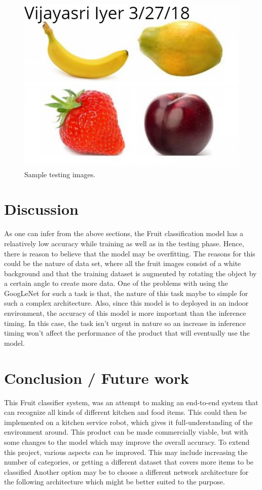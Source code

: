 \documentclass[10pt,journal,compsoc]{IEEEtran}
\begin{document}
\begin{figure}[tbhp]
      \centering
      \includegraphics[width=\linewidth]{own_img.png}
      \caption{Sample testing images.}
      \label{fig:robot1}
\end{figure}

\section{Discussion}
As one can infer from the above sections, the Fruit classification model has a relaatively low accuracy while training as well as in the testing phase. Hence, there is reason to believe that the model may be overfitting. The reasons for this could be the nature of data set, where all the fruit images consist of a white background and that the training dataset is augmented by rotating the object by a certain angle to create more data. One of the problems with using the GoogLeNet for such a task is that, the nature of this task maybe to simple for such a complex architecture. Also, since this model is to deployed in an indoor environment, the accuracy of this model is more important than the inference timing. In this case, the task isn't urgent in nature so an increase in inference timing won't affect the performance of the product that will eventually use the model.

\section{Conclusion / Future work}
This Fruit classifier system, was an attempt to making an end-to-end system that can recognize all kinds of different kitchen and food items. This could then be implemented on a kitchen service robot, which gives it full-understanding of the environment around. This product can be made commercially viable, but with some changes to the model which may improve the overall accuracy. To extend this project, various aspects can be improved. This may include increasing the number of categories, or getting a different dataset that covers more items to be classified Another option may be to choose a different network architecture for the following architecture which might be better suited to the purpose. 




\end{document}
